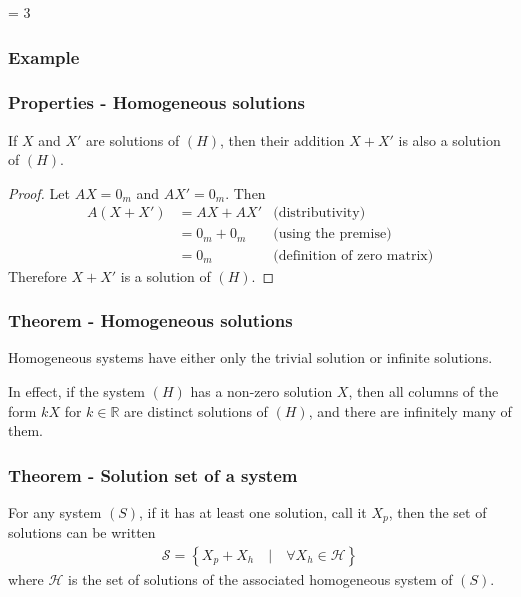 \documentclass[usenames,dvipsnames,aspectratio=169,10pt]{beamer}
\def \EXAMPLEVERSION {1} %
\numberwithin{equation}{section}
\begin{document}
\ifnum \EXAMPLEVERSION = 3
\begin{frame}
\frametitle{Example}
\end{frame}
\fi 






\begin{frame}
\frametitle{Properties - Homogeneous solutions}

If $X$ and $X'$ are solutions of $(H)$, then their addition $X+X'$ is also a solution of $(H)$.

\begin{proof}
Let $AX=0_m$ and $AX'=0_m$. Then
\begin{align*}
A(X + X') &= AX + AX' & \text{(distributivity)} \\
&=0_m + 0_m & \text{(using the premise)}\\
&=0_m & \text{(definition of zero matrix)}
\end{align*}
Therefore $X+X'$ is a solution of $(H)$.
\end{proof}
\end{frame}




\begin{frame}
\frametitle{Theorem - Homogeneous solutions}

Homogeneous systems have either only the trivial solution or infinite solutions.
 
In effect, if the system $(H)$ has a non-zero solution $X$, then all columns of the form $kX$ for $k\in\mathbb{R}$ are distinct solutions of $(H)$, and there are infinitely many of them.

\end{frame}



\begin{frame}
\frametitle{Theorem - Solution set of a system}

For any system $(S)$, if it has at least one solution, call it $X_p$, then the set of solutions can be written
\begin{align*}
\mathcal{S} = \left\{ X_p + X_h \quad | \quad \forall X_h \in \mathcal{H} \right\}
\end{align*}
where $\mathcal{H}$ is the set of solutions of the associated homogeneous system of $(S)$.
\end{frame}
\end{document}
